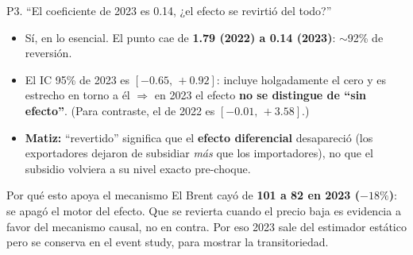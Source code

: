 \documentclass[aspectratio=169,10pt]{beamer}
\newcommand{\key}[1]{{\bfseries\color{AcentoRojo}#1}}
\begin{document}
\begin{frame}{P3. ``El coeficiente de 2023 es 0.14, ¿el efecto se revirtió del todo?''}
  \small
  \begin{itemize}
    \item Sí, en lo esencial. El punto cae de \key{1.79 (2022) a 0.14 (2023)}: $\sim$92\% de reversión.
    \item El IC 95\% de 2023 es $[-0.65,\,+0.92]$: incluye holgadamente el cero y es estrecho en
          torno a él $\Rightarrow$ en 2023 el efecto \textbf{no se distingue de ``sin efecto''}.
          (Para contraste, el de 2022 es $[-0.01,\,+3.58]$.)
    \item \textbf{Matiz:} ``revertido'' significa que el \textbf{efecto diferencial} desapareció (los
          exportadores dejaron de subsidiar \emph{más} que los importadores), no que el subsidio
          volviera a su nivel exacto pre-choque.
  \end{itemize}
  \begin{block}{Por qué esto apoya el mecanismo}
    El Brent cayó de \textbf{101 a 82 en 2023 ($-18\%$)}: se apagó el motor del efecto. Que se
    revierta cuando el precio baja es evidencia \alert{a favor} del mecanismo causal, no en contra.
    Por eso 2023 sale del estimador estático pero se conserva en el event study, para mostrar la
    transitoriedad.
  \end{block}

\end{frame}
\end{document}
